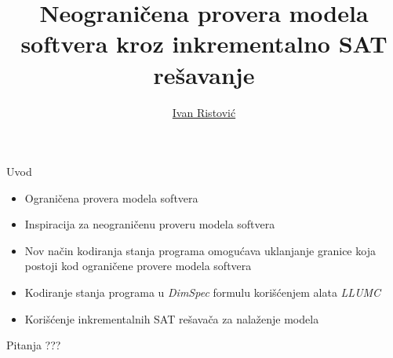 \documentclass{beamer}
\title{Neograničena provera modela softvera kroz inkrementalno SAT rešavanje}
\author{\href{mailto:ivan_ristovic@math.rs}{Ivan Ristovi\'c}}
\date{}
\begin{document}
\begin{frame}
    \titlepage
\end{frame}

\begin{frame}{Uvod}
    \begin{itemize}
        \item Ograničena provera modela softvera
        \item Inspiracija za neograničenu proveru modela softvera
        \item Nov način kodiranja stanja programa omogućava uklanjanje granice koja postoji kod ograničene provere modela softvera
        \item Kodiranje stanja programa u \emph{DimSpec} formulu korišćenjem alata \emph{LLUMC}
        \item Korišćenje inkrementalnih SAT rešavača za nalaženje modela
    \end{itemize}
\end{frame}

\begin{frame}{Pitanja}
    \centering
    ???
\end{frame}
\end{document}

